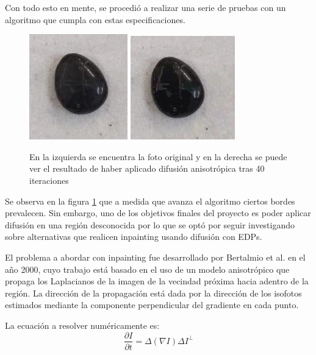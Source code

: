 \documentclass[assd_tpf_lineasinvest.tex]{subfiles}
\begin{document}
Con todo esto en mente, se procedió a realizar una serie de pruebas con un algoritmo que cumpla con estas especificaciones.
\begin{figure}[H]
\begin{centering}
\includegraphics[scale=.98]{diforig.jpeg}
\includegraphics[scale=1]{dif40it.jpeg}
\par\end{centering}
\caption{En la izquierda se encuentra la foto original y en la derecha se puede ver el resultado de haber aplicado difusión anisotrópica tras 40 iteraciones}
\label{fig:compAnisotrop}
\end{figure}
Se observa en la figura \ref{fig:compAnisotrop} que a medida que avanza el algoritmo ciertos bordes prevalecen. Sin embargo, uno de los objetivos finales del proyecto es poder aplicar difusión en una región desconocida por lo que se optó por seguir investigando sobre alternativas que realicen inpainting usando  difusión con EDPs. 


El problema a abordar con inpainting fue desarrollado por Bertalmio et al. en el año 2000, cuyo trabajo está basado en el uso de un modelo anisotrópico que propaga los Laplacianos de la imagen de la vecindad próxima hacia adentro de la región. La dirección de la propagación está dada por la dirección de los isofotos estimados mediante la componente perpendicular del gradiente en cada punto.

La ecuación a resolver numéricamente es:
\[
  \frac{\partial I}{\partial t} = \Delta(\nabla I)\Delta I^{\perp}
\]
\end{document}
